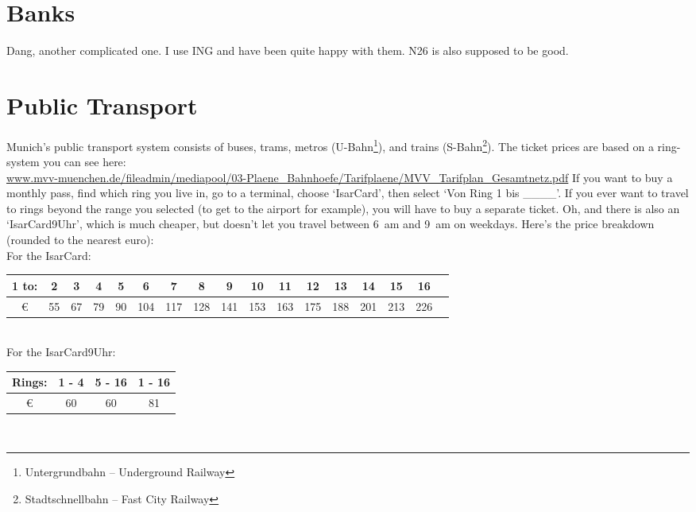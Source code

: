 \documentclass[11pt]{report}
\begin{document}
\section{Banks}
Dang, another complicated one. I use ING and have been quite happy with them. N26 is also supposed to be good.

\section{Public Transport}

Munich's public transport system consists of buses, trams, metros (U-Bahn\footnote{Untergrundbahn -- Underground Railway}), and trains (S-Bahn\footnote{Stadtschnellbahn -- Fast City Railway}). The ticket prices are based on a ring-system you can see here:\\ \href{https://www.mvv-muenchen.de/fileadmin/mediapool/03-Plaene_Bahnhoefe/Tarifplaene/MVV_Tarifplan_Gesamtnetz.pdf}{\tiny www.mvv-muenchen.de/fileadmin/mediapool/03-Plaene\_Bahnhoefe/Tarifplaene/MVV\_Tarifplan\_Gesamtnetz.pdf}
If you want to buy a monthly pass, find which ring you live in, go to a terminal, choose `IsarCard', then select `Von Ring 1 bis \_\_\_\_'. If you ever want to travel to rings beyond the range you selected (to get to the airport for example), you will have to buy a separate ticket. Oh, and there is also an `IsarCard9Uhr', which is much cheaper, but doesn't let you travel between 6~am and 9~am on weekdays. Here's the price breakdown (rounded to the nearest euro):\\

\noindent For the IsarCard:\\
{\tiny \noindent
\begin{tabular}{c||c|c|c|c|c|c|c|c|c|c|c|c|c|c|c|c|}
1 to: & 2 & 3 & 4 & 5 & 6 & 7 & 8 & 9 & 10 & 11 & 12 & 13 & 14 & 15 & 16\\
\hline
\euro{} & 55 & 67 & 79 & 90 & 104 & 117 & 128 & 141 & 153 & 163 & 175 & 188 & 201 & 213 & 226\\
\end{tabular}
}\\

\noindent For the IsarCard9Uhr:\\
{\tiny \noindent
\begin{tabular}{c||c|c|c|}
Rings: & 1 - 4  &  5 -  16 & 1 - 16 \\
\hline
\euro{} & 60 & 60 & 81 \\
\end{tabular}
}\\
\end{document}
